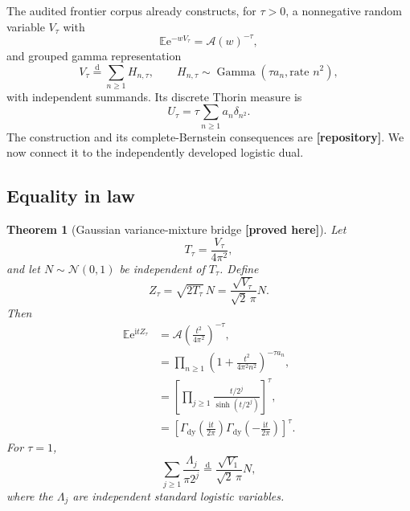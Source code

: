\documentclass[11pt,oneside]{article}
\newtheorem{theorem}{Theorem}[section]
\theoremstyle{definition}
\theoremstyle{remark}
\newcommand{\E}{\mathbb E}
\newcommand{\e}{\mathrm e}
\newcommand{\ii}{\mathrm i}
\newcommand{\dist}{\mathrel{\stackrel{\mathrm d}=}}
\newcommand{\GammaDy}{\Gamma_{\!\mathrm{dy}}}
\newcommand{\Acal}{\mathcal A}
\newcommand{\Repo}{\textcolor{deepblue}{\textbf{[repository]}}}
\newcommand{\New}{\textcolor{amber}{\textbf{[proved here]}}}
\begin{document}
The audited frontier corpus already constructs, for $\tau>0$, a nonnegative random variable
$V_\tau$ with
\begin{equation}
 \E\e^{-wV_\tau}=\Acal(w)^{-\tau},                        \label{eq:V-LT}
\end{equation}
and grouped gamma representation
\begin{equation}
 V_\tau\dist\sum_{n\ge1}H_{n,\tau},
 \qquad
 H_{n,\tau}\sim\operatorname{Gamma}(\tau a_n,
                 \text{rate }n^2),                       \label{eq:V-gamma}
\end{equation}
with independent summands.  Its discrete Thorin measure is
\begin{equation}
 U_\tau=\tau\sum_{n\ge1}a_n\delta_{n^2}.                 \label{eq:Thorin}
\end{equation}
The construction and its complete-Bernstein consequences are \Repo.  We now connect it to
the independently developed logistic dual.

\subsection{Equality in law}

\begin{theorem}[Gaussian variance-mixture bridge \New]
Let
\begin{equation}
 T_\tau=\frac{V_\tau}{4\pi^2},                            \label{eq:Ttau}
\end{equation}
and let $N\sim\mathcal N(0,1)$ be independent of $T_\tau$.  Define
\begin{equation}
 Z_\tau=\sqrt{2T_\tau}\,N
 =\frac{\sqrt{V_\tau}}{\sqrt2\,\pi}N.                   \label{eq:Ztau-mixture}
\end{equation}
Then
\begin{align}
 \E\e^{\ii tZ_\tau}
 &=\Acal\left(\frac{t^2}{4\pi^2}\right)^{-\tau},        \label{eq:Ztau-cf-A}\\
 &=\prod_{n\ge1}\left(1+\frac{t^2}{4\pi^2n^2}\right)^{-\tau a_n},
                                                               \label{eq:Ztau-cf-canonical}\\
 &=\left[\prod_{j\ge1}\frac{t/2^j}{\sinh(t/2^j)}\right]^\tau,
                                                               \label{eq:Ztau-cf-logistic}\\
 &=\left[\GammaDy\left(\frac{\ii t}{2\pi}\right)
          \GammaDy\left(-\frac{\ii t}{2\pi}\right)\right]^\tau.
                                                               \label{eq:Ztau-cf-gamma}
\end{align}
For $\tau=1$,
\begin{equation}
 \boxed{\quad
 \sum_{j\ge1}\frac{\Lambda_j}{\pi2^j}
 \dist
 \frac{\sqrt{V_1}}{\sqrt2\,\pi}N,
 \quad}                                                  \label{eq:logistic-mixture-law}
\end{equation}
where the $\Lambda_j$ are independent standard logistic variables.
\end{theorem}
\end{document}
